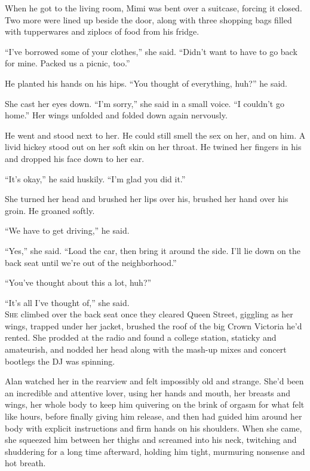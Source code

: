 When he got to the living room, Mimi was bent over a suitcase, forcing
it closed.  Two more were lined up beside the door, along with three
shopping bags filled with tupperwares and ziplocs of food from his
fridge.

``I've borrowed some of your clothes,'' she said.  ``Didn't want to
have to go back for mine.  Packed us a picnic, too.''

He planted his hands on his hips.  ``You thought of everything, huh?''
he said.

She cast her eyes down.  ``I'm sorry,'' she said in a small voice. 
``I couldn't go home.'' Her wings unfolded and folded down again
nervously.

He went and stood next to her.  He could still smell the sex on her,
and on him.  A livid hickey stood out on her soft skin on her throat. 
He twined her fingers in his and dropped his face down to her ear.

``It's okay,'' he said huskily.  ``I'm glad you did it.''

She turned her head and brushed her lips over his, brushed her hand
over his groin.  He groaned softly.

``We have to get driving,'' he said.

``Yes,'' she said.  ``Load the car, then bring it around the side. 
I'll lie down on the back seat until we're out of the neighborhood.''

``You've thought about this a lot, huh?''

``It's all I've thought of,'' she said.
\\
\lettrine[lines=3, lhang=.5, nindent=0pt, findent=2pt]{S}{he} climbed over the back seat once they cleared Queen Street,
giggling as her wings, trapped under her jacket, brushed the roof of
the big Crown Victoria he'd rented.  She prodded at the radio and
found a college station, staticky and amateurish, and nodded her head
along with the mash-up mixes and concert bootlegs the DJ was spinning.

Alan watched her in the rearview and felt impossibly old and strange. 
She'd been an incredible and attentive lover, using her hands and
mouth, her breasts and wings, her whole body to keep him quivering on
the brink of orgasm for what felt like hours, before finally giving
him release, and then had guided him around her body with explicit
instructions and firm hands on his shoulders.  When she came, she
squeezed him between her thighs and screamed into his neck, twitching
and shuddering for a long time afterward, holding him tight, murmuring
nonsense and hot breath.

